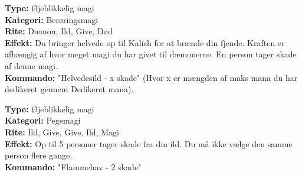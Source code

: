 \begin{dHævn*}
\textbf{Type:} Øjeblikkelig magi\\
\textbf{Kategori:} Berøringsmagi\\
\textbf{Rite:} Dæmon, Ild, Give, Død\\
\textbf{Effekt:} Du bringer helvede op til Kalish for at brænde din fjende. Kraften er afhængig af hvor meget magi du har givet til dæmonerne. En person tager skade af denne magi.\\
\textbf{Kommando:} "Helvedesild - x skade" (Hvor x er mængden af maks mana du har dedikeret gennem Dedikeret mana).
\end{dHævn*}

\begin{dHævn*}[Flammehav]
\textbf{Type:} Øjeblikkelig magi\\
\textbf{Kategori:} Pegemagi\\
\textbf{Rite:} Ild, Give, Give, Ild, Magi\\
\textbf{Effekt:} Op til 5 personer tager skade fra din ild. Du må ikke vælge den samme person flere gange.\\
\textbf{Kommando:} "Flammehav - 2 skade"
\end{dHævn*}

